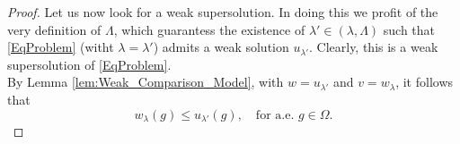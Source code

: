 \documentclass[11pt]{amsart}
\numberwithin{equation}{section} %
\theoremstyle{definition}
\begin{document}
\begin{proof}
	Let us now look for a weak supersolution. In doing this we profit of the very definition of $\Lambda$, which guarantess the existence of $\lambda' \in (\lambda, \Lambda)$ such that \eqref{EqProblem} (witht $\lambda =\lambda'$) admits a weak solution $u_{\lambda'}$. Clearly, this is a weak supersolution of \eqref{EqProblem}.\\
	By Lemma \ref{lem:Weak_Comparison_Model}, with $w = u_{\lambda'}$ and $v=w_{\lambda}$, it follows that
	\begin{equation}\label{eq:Claim}
		w_{\lambda}(g) \leq u_{\lambda'}(g), \quad \textrm{for a.e. } g\in \Omega.
	\end{equation}

\end{proof}
\end{document}
